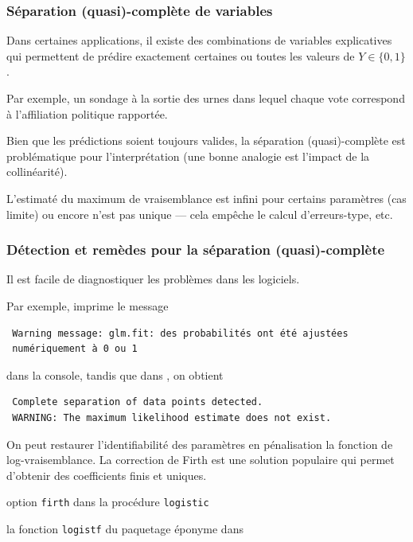 \documentclass{beamer}
\begin{document}
\begin{frame}[fragile]
 \frametitle{Séparation (quasi)-complète de variables}
 \bi \item Dans certaines applications, il existe des combinations de variables explicatives qui permettent de prédire exactement certaines ou toutes les valeurs de $Y \in \{0, 1\}$.
 \bi \item Par exemple, un sondage à la sortie des urnes dans lequel chaque vote correspond à l'affiliation politique rapportée.
 \ei
  \item  Bien que les prédictions soient toujours valides, la séparation (quasi)-complète est problématique pour l'interprétation (une bonne analogie est l'impact de la collinéarité).
\item L'estimaté du maximum de vraisemblance est infini pour certains paramètres (cas limite) ou encore n'est pas unique --- cela empêche le calcul d'erreurs-type, etc. 
\ei
\end{frame}
\begin{frame}[fragile]
\frametitle{Détection et remèdes pour la séparation (quasi)-complète}
 \bi \item Il est facile de diagnostiquer les problèmes dans les logiciels.
 \item Par exemple, \Rlang{} imprime le message 
 {\footnotesize  
\begin{verbatim}
 Warning message: glm.fit: des probabilités ont été ajustées 
 numériquement à 0 ou 1
\end{verbatim}
} dans la console, tandis que dans  \SASlang{}, on obtient
{\footnotesize 
 \begin{verbatim}
 Complete separation of data points detected. 
 WARNING: The maximum likelihood estimate does not exist.
 \end{verbatim}
 }
\item On peut restaurer l'identifiabilité des paramètres en pénalisation la fonction de log-vraisemblance. La correction de Firth est une solution populaire qui permet d'obtenir des coefficients finis et uniques. 
 \bi \item option \texttt{firth} dans la procédure \SASlang{} \texttt{logistic} 
 \item la fonction \texttt{logistf} du paquetage éponyme dans \Rlang{}
 \ei
 \ei
\end{frame}
\end{document}
